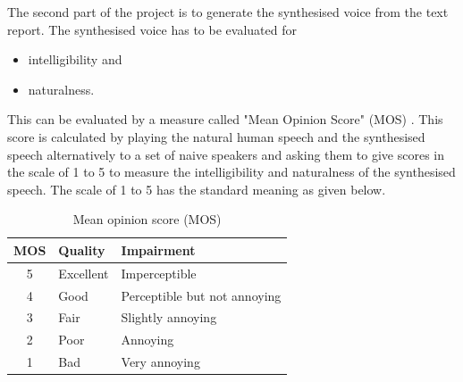 \documentclass{article}
\begin{document}
The second part of the project is to generate the synthesised voice from the text report. The synthesised voice has to be evaluated for 
\begin{itemize} 
\item intelligibility and 
\item naturalness.
\end{itemize} 
This can be evaluated by a measure called "Mean Opinion Score" (MOS) \cite{mos}.
This score is calculated by playing the natural human speech and the synthesised speech alternatively to a set of naive speakers and asking them to give scores in the scale of 1 to 5 to measure the intelligibility and naturalness of the synthesised speech. The scale of 1 to 5 has the standard meaning as given below.
\begin{table}[h]
\centering
\begin{tabular}{|c|l|l|}
\hline 
{\bf MOS	} & {\bf Quality } & {\bf Impairment} \\
\hline
5 & Excellent	& Imperceptible \\
4	& Good	& Perceptible but not annoying \\
3	& Fair	& Slightly annoying \\
2	& Poor	& Annoying \\
1	& Bad	& Very annoying \\ 
\hline 
\end{tabular}
\vspace{2mm}
\caption{Mean opinion score (MOS)}
\label{tab:mosDefn}
\end{table}



\clearpage 



\end{document}
